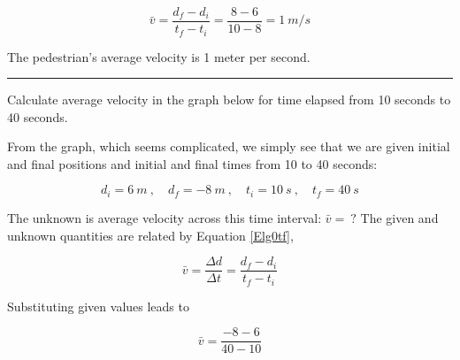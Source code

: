 \documentclass{article}
\begin{document}
\begin{equation*}
    \bar{v} = \frac{d_f - d_i}{t_f - t_i} = \frac{8 - 6}{10 - 8} = \SI{1}{m/s}
\end{equation*}

The pedestrian's average velocity is 1 meter per second.

\hrule

\begin{example}
    Calculate average velocity in the graph below for time elapsed from 10 seconds to 40 seconds.
\end{example}

\begin{center}
\end{center}

 From the graph, which seems complicated, we simply see that we are given initial and final positions and initial and final times from 10 to 40 seconds:

\begin{equation*}
    d_i = \SI{6}{m}\ , \quad
    d_f = \SI{-8}{m}\ , \quad
    t_i = \SI{10}{s}\ , \quad
    t_f = \SI{40}{s}
\end{equation*}

The unknown is average velocity across this time interval: $\bar{v} =\ ?$ The given and unknown quantities are related by Equation \eqref{Elg0tf},

\begin{equation*}
    \bar{v} = \frac{\Delta{d}}{\Delta{t}} = \frac{d_f - d_i}{t_f - t_i}
\end{equation*}

Substituting given values leads to

\begin{equation*}
    \bar{v} = \frac{-8-6}{40-10}
\end{equation*}
\end{document}
